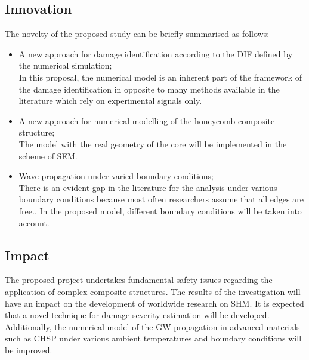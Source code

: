 \documentclass[a4paper,12pt]{article}
\begin{document}
\subsection{Innovation}
The novelty of the proposed study can be briefly summarised as follows:
\begin{itemize}
	\item A new approach for damage identification according to the DIF defined by the numerical simulation;\\
		In this proposal, the numerical model is an inherent part of the framework of the damage identification in opposite to many methods available in the literature which rely on experimental signals only. 
	\item A new approach for numerical modelling of the honeycomb composite structure;\\
		The model with the real geometry of the core will be implemented in the scheme of SEM.  
	\item Wave propagation under varied boundary conditions;\\
		There is an evident gap in the literature for the analysis under various boundary conditions because most often researchers assume that all edges are free.. In the proposed model, different boundary conditions will be taken into account.
\end{itemize}
\subsection{Impact}
The proposed project undertakes fundamental safety issues regarding the application of complex composite structures. The results of the investigation will have an impact on the development of worldwide research on SHM. It is expected that a novel technique for damage severity estimation will be developed.
Additionally, the numerical model of the GW propagation in advanced materials such as CHSP under various ambient temperatures and boundary conditions will be improved.
\end{document}
